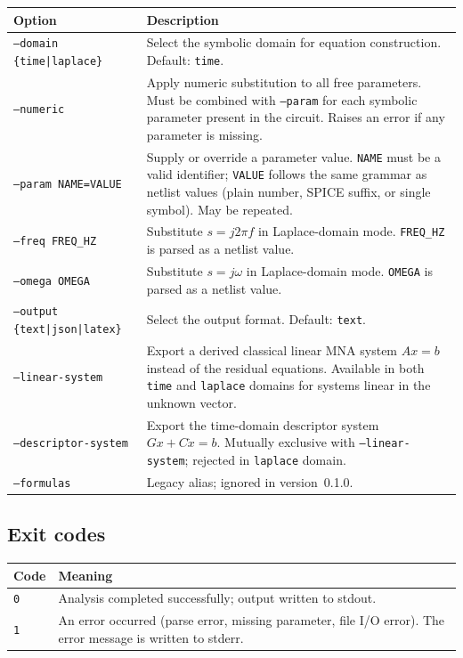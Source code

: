 \documentclass[11pt,a4paper]{article}
\newcommand{\code}[1]{\texttt{#1}}
\begin{document}
\begin{longtable}{p{}p{}}
\toprule
Option & Description \\
\midrule
\code{--domain \{time|laplace\}} &
    Select the symbolic domain for equation construction.
    Default: \code{time}. \\[4pt]
\code{--numeric} &
    Apply numeric substitution to all free parameters.
    Must be combined with \code{--param} for each symbolic parameter present in the circuit.
    Raises an error if any parameter is missing. \\[4pt]
\code{--param NAME=VALUE} &
    Supply or override a parameter value.
    \code{NAME} must be a valid identifier; \code{VALUE} follows the same grammar
    as netlist values (plain number, SPICE suffix, or single symbol).
    May be repeated. \\[4pt]
\code{--freq FREQ\_HZ} &
    Substitute \(s = j2\pi f\) in Laplace-domain mode.
    \code{FREQ\_HZ} is parsed as a netlist value. \\[4pt]
\code{--omega OMEGA} &
    Substitute \(s = j\omega\) in Laplace-domain mode.
    \code{OMEGA} is parsed as a netlist value. \\[4pt]
\code{--output \{text|json|latex\}} &
    Select the output format. Default: \code{text}. \\[4pt]
\code{--linear-system} &
    Export a derived classical linear MNA system \(A x = b\) instead of the
    residual equations. Available in both \code{time} and \code{laplace}
    domains for systems linear in the unknown vector. \\[4pt]
\code{--descriptor-system} &
    Export the time-domain descriptor system \(Gx + C\dot{x} = b\). Mutually
    exclusive with \code{--linear-system}; rejected in \code{laplace} domain. \\[4pt]
\code{--formulas} &
    Legacy alias; ignored in version~0.1.0. \\
\bottomrule
\end{longtable}

\subsection{Exit codes}

\begin{longtable}{p{}p{}}
\toprule
Code & Meaning \\
\midrule
\code{0} & Analysis completed successfully; output written to stdout. \\
\code{1} & An error occurred (parse error, missing parameter, file I/O error).
           The error message is written to stderr. \\
\bottomrule
\end{longtable}
\end{document}
